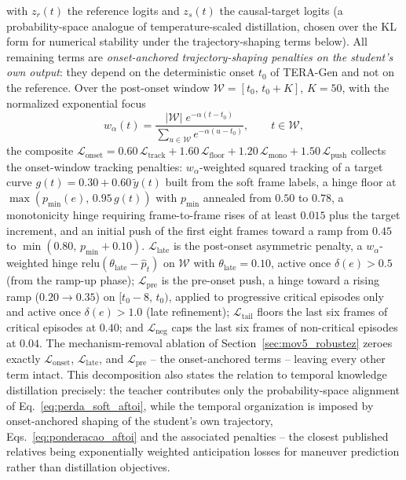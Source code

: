 \documentclass[a4paper,fleqn]{cas-dc}
\newcommand{\TERAGen}{\mbox{TERA-Gen}\xspace}
\begin{document}
{\begin{equation}
  \label{eq:perda_soft_aftoi}
\end{equation}
with $z_r(t)$ the reference logits and $z_s(t)$ the causal-target logits (a
probability-space analogue of temperature-scaled distillation, chosen over the
KL form for numerical stability under the trajectory-shaping terms below). All
remaining terms are \emph{onset-anchored trajectory-shaping penalties on the
student's own output}: they depend on the deterministic onset $t_0$ of
\TERAGen and not on the reference. Over the post-onset window
$\mathcal{W} = [t_0,\, t_0{+}K]$, $K{=}50$, with the normalized exponential
focus
\begin{equation}
  w_\alpha(t) = \frac{|\mathcal{W}|\;
    e^{-\alpha (t - t_0)}}{\sum_{u \in \mathcal{W}} e^{-\alpha (u - t_0)}},
  \qquad t \in \mathcal{W},
\label{eq:ponderacao_aftoi}
\end{equation}
the composite $\mathcal{L}_{\text{onset}} = 0.60\,\mathcal{L}_{\text{track}} +
1.60\,\mathcal{L}_{\text{floor}} + 1.20\,\mathcal{L}_{\text{mono}} +
1.50\,\mathcal{L}_{\text{push}}$ collects the onset-window tracking penalties:
$w_\alpha$-weighted squared tracking of a target curve
$g(t) = 0.30 + 0.60\,\tilde{y}(t)$ built from the soft frame labels, a hinge
floor at $\max(p_{\min}(e),\, 0.95\,g(t))$ with $p_{\min}$ annealed from
$0.50$ to $0.78$, a monotonicity hinge requiring frame-to-frame rises of at
least $0.015$ plus the target increment, and an initial push of the first
eight frames toward a ramp from $0.45$ to $\min(0.80,\, p_{\min}{+}0.10)$.
$\mathcal{L}_{\text{late}}$ is the post-onset asymmetric penalty, a
$w_\alpha$-weighted hinge $\mathrm{relu}(\theta_{\text{late}} - \hat{p}_t)$ on
$\mathcal{W}$ with $\theta_{\text{late}}{=}0.10$, active once
$\delta(e) > 0.5$ (from the ramp-up phase);
$\mathcal{L}_{\text{pre}}$ is the pre-onset push, a hinge toward a rising ramp
($0.20 \rightarrow 0.35$) on $[t_0{-}8,\, t_0)$, applied to progressive
critical episodes only and active once $\delta(e) > 1.0$ (late refinement); $\mathcal{L}_{\text{tail}}$ floors the last six frames
of critical episodes at $0.40$; and $\mathcal{L}_{\text{neg}}$ caps the last
six frames of non-critical episodes at $0.04$. The mechanism-removal ablation
of Section~\ref{sec:mov5_robustez} zeroes exactly
$\mathcal{L}_{\text{onset}}$, $\mathcal{L}_{\text{late}}$, and
$\mathcal{L}_{\text{pre}}$ -- the onset-anchored terms -- leaving every other
term intact. This decomposition also states the relation to temporal knowledge
distillation precisely: the teacher contributes only the probability-space
alignment of Eq.~\ref{eq:perda_soft_aftoi}, while the temporal organization is
imposed by onset-anchored shaping of the student's own trajectory,
Eqs.~\ref{eq:ponderacao_aftoi} and the associated penalties -- the closest
published relatives being exponentially weighted anticipation losses for
maneuver prediction rather than distillation objectives.}
\end{document}
